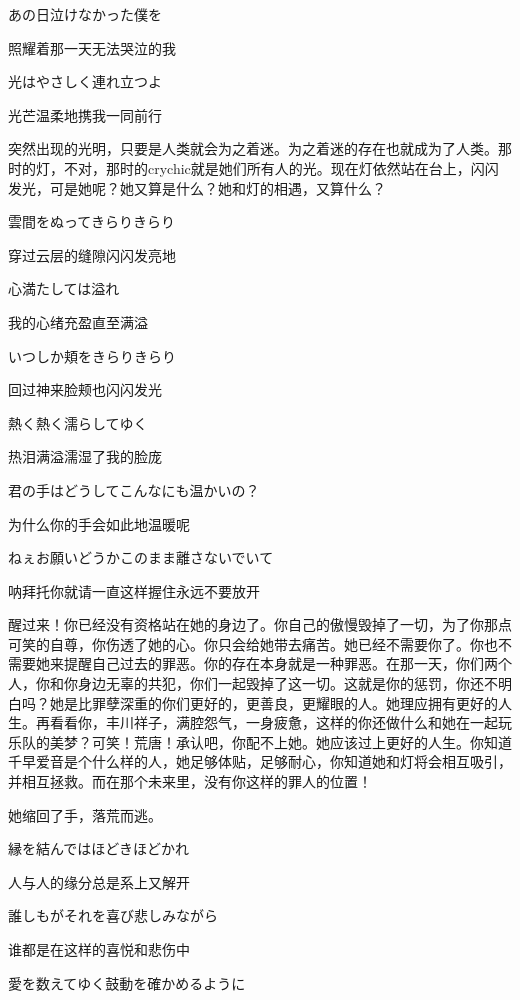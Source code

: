 \documentclass{article}
\begin{document}
あの日泣けなかった僕を

照耀着那一天无法哭泣的我

光はやさしく連れ立つよ

光芒温柔地携我一同前行



突然出现的光明，只要是人类就会为之着迷。为之着迷的存在也就成为了人类。那时的灯，不对，那时的crychic就是她们所有人的光。现在灯依然站在台上，闪闪发光，可是她呢？她又算是什么？她和灯的相遇，又算什么？



雲間をぬってきらりきらり

穿过云层的缝隙闪闪发亮地

心満たしては溢れ

我的心绪充盈直至满溢

いつしか頬をきらりきらり

回过神来脸颊也闪闪发光

熱く熱く濡らしてゆく

热泪满溢濡湿了我的脸庞

君の手はどうしてこんなにも温かいの？

为什么你的手会如此地温暖呢

ねぇお願いどうかこのまま離さないでいて

呐拜托你就请一直这样握住永远不要放开



醒过来！你已经没有资格站在她的身边了。你自己的傲慢毁掉了一切，为了你那点可笑的自尊，你伤透了她的心。你只会给她带去痛苦。她已经不需要你了。你也不需要她来提醒自己过去的罪恶。你的存在本身就是一种罪恶。在那一天，你们两个人，你和你身边无辜的共犯，你们一起毁掉了这一切。这就是你的惩罚，你还不明白吗？她是比罪孽深重的你们更好的，更善良，更耀眼的人。她理应拥有更好的人生。再看看你，丰川祥子，满腔怨气，一身疲惫，这样的你还做什么和她在一起玩乐队的美梦？可笑！荒唐！承认吧，你配不上她。她应该过上更好的人生。你知道千早爱音是个什么样的人，她足够体贴，足够耐心，你知道她和灯将会相互吸引，并相互拯救。而在那个未来里，没有你这样的罪人的位置！



她缩回了手，落荒而逃。



縁を結んではほどきほどかれ

人与人的缘分总是系上又解开

誰しもがそれを喜び悲しみながら

谁都是在这样的喜悦和悲伤中

愛を数えてゆく鼓動を確かめるように
\end{document}
